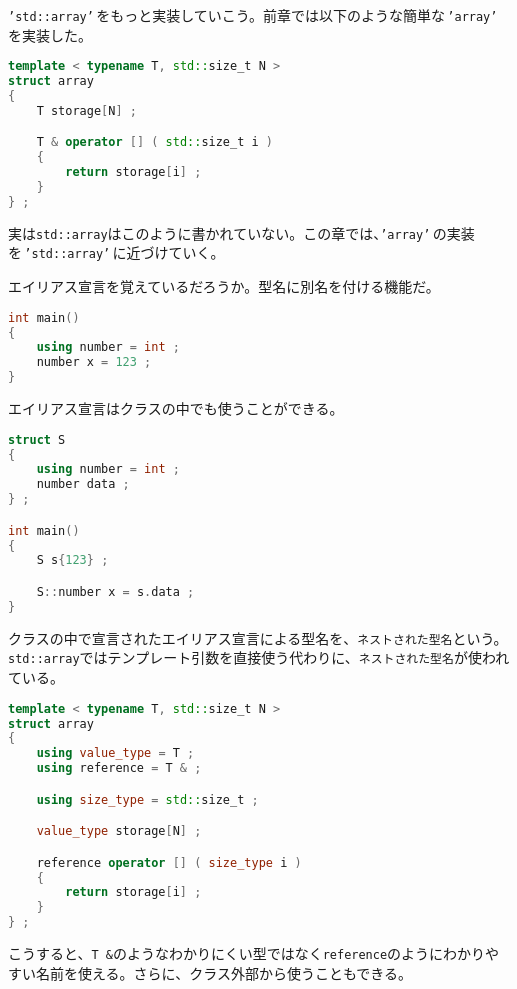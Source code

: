 
\texttt{'std::array'}\,をもっと実装していこう。前章では以下のような簡単な\,\texttt{'array'}\,を実装した。

\begin{lstlisting}[language={C++}]
template < typename T, std::size_t N >
struct array
{
    T storage[N] ;

    T & operator [] ( std::size_t i )
    {
        return storage[i] ;
    }
} ;
\end{lstlisting}

実は\texttt{std::array}はこのように書かれていない。この章では、\texttt{'array'}\,の実装を\,\texttt{'std::array'}\,に近づけていく。


エイリアス宣言を覚えているだろうか。型名に別名を付ける機能だ。

\begin{lstlisting}[language={C++}]
int main()
{
    using number = int ;
    number x = 123 ;
}
\end{lstlisting}

エイリアス宣言はクラスの中でも使うことができる。

\begin{lstlisting}[language={C++}]
struct S
{
    using number = int ;
    number data ;
} ;

int main()
{
    S s{123} ;

    S::number x = s.data ;
}
\end{lstlisting}

クラスの中で宣言されたエイリアス宣言による型名を、\texttt{ネストされた型名}という。\texttt{std::array}ではテンプレート引数を直接使う代わりに、\texttt{ネストされた型名}が使われている。

\begin{lstlisting}[language={C++}]
template < typename T, std::size_t N >
struct array
{
    using value_type = T ;
    using reference = T & ;

    using size_type = std::size_t ;

    value_type storage[N] ;

    reference operator [] ( size_type i )
    {
        return storage[i] ;
    }
} ;
\end{lstlisting}

こうすると、\texttt{T \&}のようなわかりにくい型ではなく\texttt{reference}のようにわかりやすい名前を使える。さらに、クラス外部から使うこともできる。

